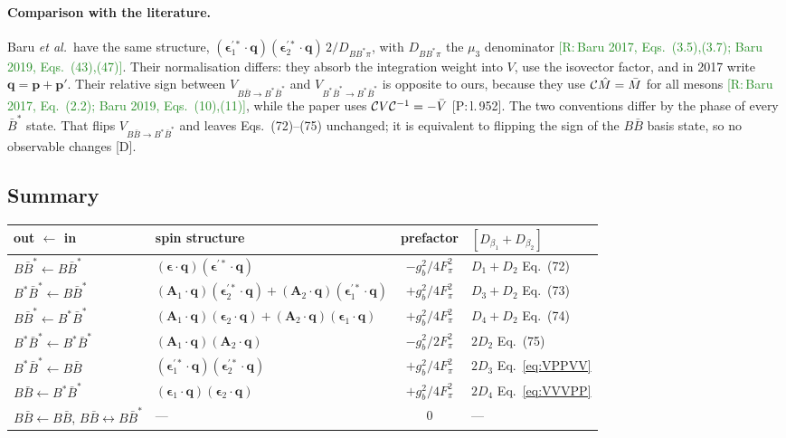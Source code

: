 \documentclass[11pt,a4paper]{article}
\newcommand{\tagP}[1]{\textcolor{blue!65!black}{\textsf{\small[P:\,#1]}}}
\newcommand{\tagR}[1]{\textcolor{ForestGreen}{\textsf{\small[R:\,#1]}}}
\newcommand{\tagD}{\textcolor{orange!85!black}{\textsf{\small[D]}}}
\newcommand{\BB}{B\bar B}
\newcommand{\BBst}{B\bar B^*}
\newcommand{\BstBst}{B^*\bar B^*}
\newcommand{\vq}{\bm q}
\newcommand{\vep}{\bm p}
\newcommand{\veps}{\bm\epsilon}
\newcommand{\vA}{\bm A}
\begin{document}
\paragraph{Comparison with the literature.} Baru \emph{et al.}\ have the same structure, $(\veps_1^{\prime*}\cdot\vq)(\veps_2^{\prime*}\cdot\vq)\,2/D_{BB^*\pi}$, with $D_{BB^*\pi}$ the $\mu_3$ denominator \tagR{Baru 2017, Eqs.~(3.5),(3.7); Baru 2019, Eqs.~(43),(47)}. Their normalisation differs: they absorb the integration weight into $V$, use the isovector factor, and in 2017 write $\vq=\vep+\vep'$. Their relative sign between $V_{\BB\to\BstBst}$ and $V_{\BstBst\to\BstBst}$ is opposite to ours, because they use ${\cal C}\hat M=\bar M$ for all mesons \tagR{Baru 2017, Eq.~(2.2); Baru 2019, Eqs.~(10),(11)}, while the paper uses ${\cal C}V{\cal C}^{-1}=-\bar V$ \tagP{l.\,952}. The two conventions differ by the phase of every $\bar B^*$ state. That flips $V_{\BB\to\BstBst}$ and leaves Eqs.~(72)--(75) unchanged; it is equivalent to flipping the sign of the $\BB$ basis state, so no observable changes \tagD.

\subsection{Summary}
\label{sec:ome-summary}

\begin{center}
\small
\begin{tabular}{llcl}
\toprule
out $\leftarrow$ in & spin structure & prefactor & $[D_{\beta_1}+D_{\beta_2}]$\\
\midrule
$\BBst\leftarrow\BBst$ & $(\veps\cdot\vq)(\veps^{\prime*}\cdot\vq)$ & $-g_b^2/4F_\pi^2$ & $D_1+D_2$ \quad Eq.~(72)\\
$\BstBst\leftarrow\BBst$ & $(\vA_1\cdot\vq)(\veps_2^{\prime*}\cdot\vq)+(\vA_2\cdot\vq)(\veps_1^{\prime*}\cdot\vq)$ & $+g_b^2/4F_\pi^2$ & $D_3+D_2$ \quad Eq.~(73)\\
$\BBst\leftarrow\BstBst$ & $(\vA_1\cdot\vq)(\veps_2\cdot\vq)+(\vA_2\cdot\vq)(\veps_1\cdot\vq)$ & $+g_b^2/4F_\pi^2$ & $D_4+D_2$ \quad Eq.~(74)\\
$\BstBst\leftarrow\BstBst$ & $(\vA_1\cdot\vq)(\vA_2\cdot\vq)$ & $-g_b^2/2F_\pi^2$ & $2D_2$ \quad Eq.~(75)\\
$\BstBst\leftarrow\BB$ & $(\veps_1^{\prime*}\cdot\vq)(\veps_2^{\prime*}\cdot\vq)$ & $+g_b^2/4F_\pi^2$ & $2D_3$ \quad Eq.~\eqref{eq:VPPVV}\\
$\BB\leftarrow\BstBst$ & $(\veps_1\cdot\vq)(\veps_2\cdot\vq)$ & $+g_b^2/4F_\pi^2$ & $2D_4$ \quad Eq.~\eqref{eq:VVVPP}\\
$\BB\leftarrow\BB$, $\BB\leftrightarrow\BBst$ & --- & 0 & ---\\
\bottomrule
\end{tabular}
\end{center}
\end{document}
